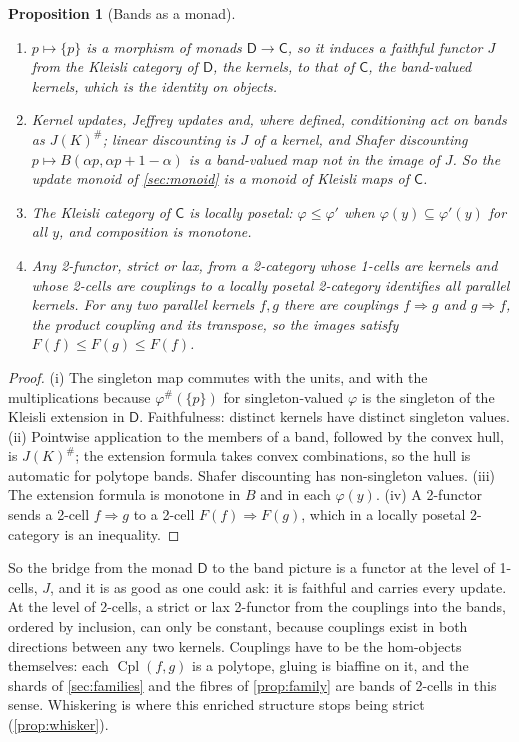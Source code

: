 \documentclass[11pt]{article}
\newtheorem{proposition}[theorem]{Proposition}
\theoremstyle{definition}
\theoremstyle{remark}
\newcommand{\D}{\mathsf{D}}
\newcommand{\Cpl}{\operatorname{Cpl}}
\begin{document}
\begin{proposition}[Bands as a monad]\label{prop:bandmonad}
\begin{enumerate}[label=(\roman*)]
\item $p\mapsto\{p\}$ is a morphism of monads $\D\to\mathsf C$, so it induces a faithful functor $J$ from the Kleisli category of $\D$, the
  kernels, to that of $\mathsf C$, the band-valued kernels, which is the identity on objects.
\item Kernel updates, Jeffrey updates and, where defined, conditioning act on bands as $J(K)^\#$; linear discounting is $J$ of a kernel, and
  Shafer discounting $p\mapsto B(\alpha p,\alpha p+1-\alpha)$ is a band-valued map not in the image of $J$. So the update monoid of
  \cref{sec:monoid} is a monoid of Kleisli maps of $\mathsf C$.
\item The Kleisli category of $\mathsf C$ is locally posetal: $\varphi\le\varphi'$ when $\varphi(y)\subseteq\varphi'(y)$ for all $y$, and composition is
  monotone.
\item Any 2-functor, strict or lax, from a 2-category whose 1-cells are kernels and whose 2-cells are couplings to a locally posetal
  2-category identifies all parallel kernels. For any two parallel kernels $f,g$ there are couplings $f\Rightarrow g$ and $g\Rightarrow f$, the
  product coupling and its transpose, so the images satisfy $F(f)\le F(g)\le F(f)$.
\end{enumerate}
\end{proposition}
\begin{proof}
(i) The singleton map commutes with the units, and with the multiplications because $\varphi^\#(\{p\})$ for singleton-valued $\varphi$ is the
singleton of the Kleisli extension in $\D$. Faithfulness: distinct kernels have distinct singleton values. (ii) Pointwise application to
the members of a band, followed by the convex hull, is $J(K)^\#$; the extension formula takes convex combinations, so the hull is
automatic for polytope bands. Shafer discounting has non-singleton values. (iii) The extension formula is monotone in $B$ and in each
$\varphi(y)$. (iv) A 2-functor sends a 2-cell $f\Rightarrow g$ to a 2-cell $F(f)\Rightarrow F(g)$, which in a locally posetal 2-category is an
inequality.
\end{proof}

So the bridge from the monad $\D$ to the band picture is a functor at the level of 1-cells, $J$, and it is as good as one could ask: it
is faithful and carries every update. At the level of 2-cells, a strict or lax 2-functor from the couplings into the bands, ordered by
inclusion, can only be constant, because couplings exist in both directions between any two kernels. Couplings have to be the hom-objects
themselves: each $\Cpl(f,g)$ is a polytope, gluing is biaffine on it, and the shards of \cref{sec:families} and the fibres of \cref{prop:family}
are bands of 2-cells in this sense. Whiskering is where this enriched structure stops being strict (\cref{prop:whisker}).
\end{document}
